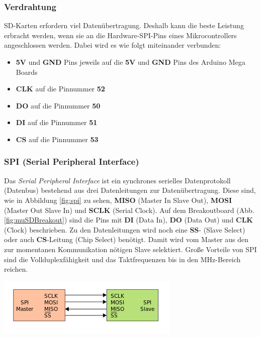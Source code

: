 \subsubsection{Verdrahtung}
SD-Karten erfordern viel Datenübertragung. Deshalb kann die beste Leistung erbracht werden, wenn sie an die Hardware-SPI-Pins eines Mikrocontrollers angeschlossen werden. Dabei wird es wie folgt miteinander verbunden: \cite{ladyada2018}
\begin{itemize}
\item \textbf{5V} und \textbf{GND} Pins jeweils auf die \textbf{5V} und \textbf{GND} Pins des Arduino Mega Boards
\item \textbf{CLK} auf die Pinnummer \textbf{52}
\item \textbf{DO} auf die Pinnummer \textbf{50}
\item \textbf{DI} auf die Pinnummer \textbf{51}
\item \textbf{CS} auf die Pinnummer \textbf{53}
\end{itemize}
\newpage

\subsubsection{SPI (Serial Peripheral Interface)}
\label{subsubsec:spi}
\begin{minipage}{0.48\textwidth}
Das \textit{Serial Peripheral Interface} ist ein synchrones serielles Datenprotokoll (Datenbus) bestehend aus drei Datenleitungen zur Datenübertragung. Diese sind, wie in Abbildung \ref{fig:spi} zu sehen, \textbf{MISO} (Master In Slave Out), \textbf{MOSI} (Master Out Slave In) und \textbf{SCLK} (Serial Clock). Auf dem Breakoutboard (Abb. \ref{fig:muSDBreakout}) sind die Pins mit \textbf{DI} (Data In), \textbf{DO} (Data Out) und \textbf{CLK} (Clock) beschrieben. Zu den Datenleitungen wird noch eine \textbf{SS}- (Slave Select) oder auch \textbf{CS}-Leitung (Chip Select) benötigt. Damit wird vom Master aus den zur momentanen Kommunikation nötigen Slave selektiert. Große Vorteile von SPI sind die Vollduplexfähigkeit und das Taktfrequenzen bis in den MHz-Bereich reichen. \cite{spi}\cite{Wikipedia2018spi}\\
\end{minipage}
\begin{minipage}{0.51\textwidth}
\centering
\includegraphics[width=\textwidth]{graphics/Datenspeicherung/spi_master_slave.png}
\label{fig:spi}
\end{minipage}

